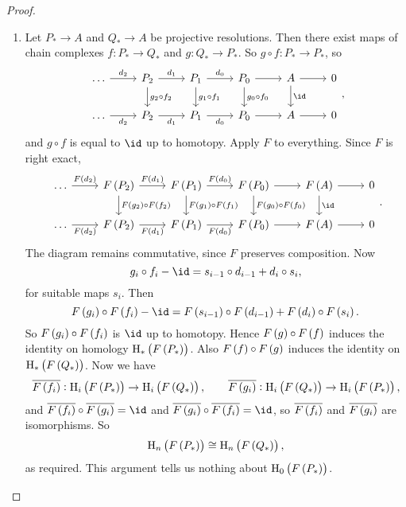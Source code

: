 
\begin{proof}
\hfill
\begin{enumerate}
\item Let $ P_* \to A $ and $ Q_* \to A $ be projective resolutions. Then there exist maps of chain complexes $ f : P_* \to Q_* $ and $ g : Q_* \to P_* $. So $ g \circ f : P_* \to P_* $, so
$$
\begin{tikzcd}
\dots \arrow{r}{d_2} & P_2 \arrow{r}{d_1} \arrow{d}{g_2 \circ f_2} & P_1 \arrow{r}{d_0} \arrow{d}{g_1 \circ f_1} & P_0 \arrow{r} \arrow{d}{g_0 \circ f_0} & A \arrow{r} \arrow{d}{\id} & 0 \\
\dots \arrow{r}[swap]{d_2} & P_2 \arrow{r}[swap]{d_1} & P_1 \arrow{r}[swap]{d_0} & P_0 \arrow{r} & A \arrow{r} & 0
\end{tikzcd},
$$
and $ g \circ f $ is equal to $ \id $ up to homotopy. Apply $ F $ to everything. Since $ F $ is right exact,
$$
\begin{tikzcd}
\dots \arrow{r}{F\br{d_2}} & F\br{P_2} \arrow{r}{F\br{d_1}} \arrow{d}{F\br{g_2} \circ F\br{f_2}} & F\br{P_1} \arrow{r}{F\br{d_0}} \arrow{d}{F\br{g_1} \circ F\br{f_1}} & F\br{P_0} \arrow{r} \arrow{d}{F\br{g_0} \circ F\br{f_0}} & F\br{A} \arrow{r} \arrow{d}{\id} & 0 \\
\dots \arrow{r}[swap]{F\br{d_2}} & F\br{P_2} \arrow{r}[swap]{F\br{d_1}} & F\br{P_1} \arrow{r}[swap]{F\br{d_0}} & F\br{P_0} \arrow{r} & F\br{A} \arrow{r} & 0
\end{tikzcd}.
$$
The diagram remains commutative, since $ F $ preserves composition. Now
$$ g_i \circ f_i - \id = s_{i - 1} \circ d_{i - 1} + d_i \circ s_i, $$
for suitable maps $ s_i $. Then
$$ F\br{g_i} \circ F\br{f_i} - \id = F\br{s_{i - 1}} \circ F\br{d_{i - 1}} + F\br{d_i} \circ F\br{s_i}. $$
So $ F\br{g_i} \circ F\br{f_i} $ is $ \id $ up to homotopy. Hence $ F\br{g} \circ F\br{f} $ induces the identity on homology $ \H_*\br{F\br{P_*}} $. Also $ F\br{f} \circ F\br{g} $ induces the identity on $ \H_*\br{F\br{Q_*}} $. Now we have
$$ \overline{F\br{f_i}} : \H_i\br{F\br{P_*}} \to \H_i\br{F\br{Q_*}}, \qquad \overline{F\br{g_i}} : \H_i\br{F\br{Q_*}} \to \H_i\br{F\br{P_*}}, $$
and $ \overline{F\br{f_i}} \circ \overline{F\br{g_i}} = \id $ and $ \overline{F\br{g_i}} \circ \overline{F\br{f_i}} = \id $, so $ \overline{F\br{f_i}} $ and $ \overline{F\br{g_i}} $ are isomorphisms. So
$$ \H_n\br{F\br{P_*}} \cong \H_n\br{F\br{Q_*}}, $$
as required. This argument tells us nothing about $ \H_0\br{F\br{P_*}} $.


\end{enumerate}
\end{proof}
